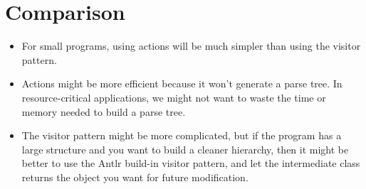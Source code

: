 \documentclass[a4paper,12pt,titlepage]{article}
\begin{document}
\section {Comparison}
\begin{itemize}
	\item For small programs, using actions will be much simpler than using the visitor pattern.
	\item Actions might be more efficient because it won't generate a parse tree. In resource-critical applications, we might not want to waste the time or memory needed to build a parse tree.
	\item The visitor pattern might be more complicated, but if the program has a large structure and you want to build a cleaner hierarchy, then it might be better to use the Antlr build-in visitor pattern, and let the intermediate class returns the object you want for future modification.
\end{itemize}
\end{document}
